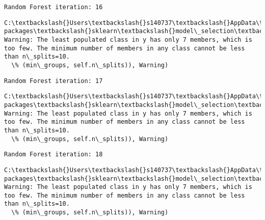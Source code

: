 \documentclass[11pt]{article}
\begin{document}
    \begin{Verbatim}[commandchars=\\\{\}]
Random Forest iteration: 16 

    \end{Verbatim}

    \begin{Verbatim}[commandchars=\\\{\}]
C:\textbackslash{}Users\textbackslash{}s140737\textbackslash{}AppData\textbackslash{}Local\textbackslash{}Continuum\textbackslash{}anaconda3\textbackslash{}lib\textbackslash{}site-packages\textbackslash{}sklearn\textbackslash{}model\_selection\textbackslash{}\_split.py:605: Warning: The least populated class in y has only 7 members, which is too few. The minimum number of members in any class cannot be less than n\_splits=10.
  \% (min\_groups, self.n\_splits)), Warning)

    \end{Verbatim}

    \begin{Verbatim}[commandchars=\\\{\}]
Random Forest iteration: 17 

    \end{Verbatim}

    \begin{Verbatim}[commandchars=\\\{\}]
C:\textbackslash{}Users\textbackslash{}s140737\textbackslash{}AppData\textbackslash{}Local\textbackslash{}Continuum\textbackslash{}anaconda3\textbackslash{}lib\textbackslash{}site-packages\textbackslash{}sklearn\textbackslash{}model\_selection\textbackslash{}\_split.py:605: Warning: The least populated class in y has only 7 members, which is too few. The minimum number of members in any class cannot be less than n\_splits=10.
  \% (min\_groups, self.n\_splits)), Warning)

    \end{Verbatim}

    \begin{Verbatim}[commandchars=\\\{\}]
Random Forest iteration: 18 

    \end{Verbatim}

    \begin{Verbatim}[commandchars=\\\{\}]
C:\textbackslash{}Users\textbackslash{}s140737\textbackslash{}AppData\textbackslash{}Local\textbackslash{}Continuum\textbackslash{}anaconda3\textbackslash{}lib\textbackslash{}site-packages\textbackslash{}sklearn\textbackslash{}model\_selection\textbackslash{}\_split.py:605: Warning: The least populated class in y has only 7 members, which is too few. The minimum number of members in any class cannot be less than n\_splits=10.
  \% (min\_groups, self.n\_splits)), Warning)

    \end{Verbatim}
\end{document}
